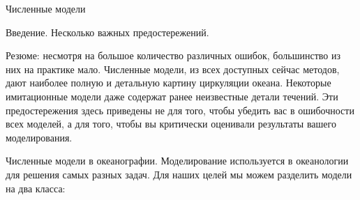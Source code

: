 \begin{chapter}{Численные модели}
\begin{section}{Введение. Несколько важных предостережений.}
\begin{paragraph}{Резюме:}
 несмотря на большое количество различных ошибок, большинство
из них на практике мало. Численные модели, из всех доступных сейчас
методов, дают наиболее полную и детальную картину циркуляции
океана. Некоторые имитационные модели даже содержат ранее неизвестные
детали течений. Эти предостережения здесь приведены не для того, чтобы
убедить вас в ошибочности всех моделей, а для того, чтобы вы
критически оценивали результаты вашего моделирования.
%
\end{paragraph}
\end{section}

\begin{section}{Численные модели в океанографии.}
Моделирование используется в океанологии для решения самых разных
задач. Для наших целей мы можем разделить модели на два класса:
%


\end{section}
\end{chapter}
